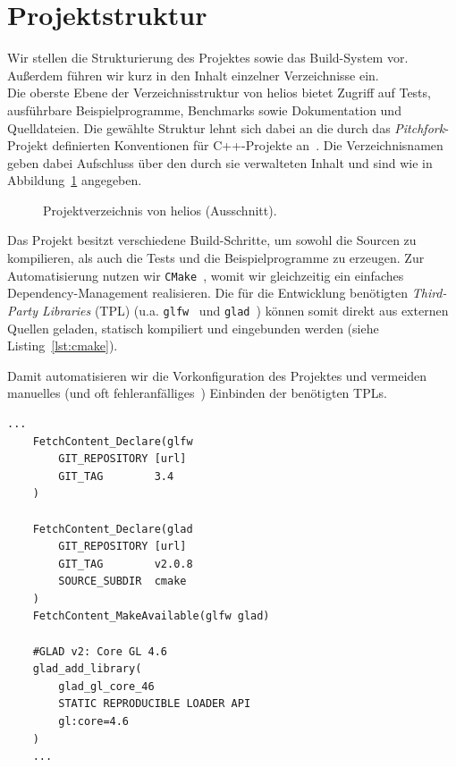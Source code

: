 \section{Projektstruktur}
Wir stellen die Strukturierung des Projektes sowie das Build-System vor.
Außerdem führen wir kurz in den Inhalt einzelner Verzeichnisse ein.\\

Die oberste Ebene der Verzeichnisstruktur von helios bietet Zugriff auf Tests, ausführbare Beispielprogramme, Benchmarks sowie Dokumentation und Quelldateien.
Die gewählte Struktur lehnt sich dabei an die durch das \textit{Pitchfork}-Projekt definierten Konventionen für C++-Projekte an~\cite[]{Pitchfork}.
Die Verzeichnisnamen geben dabei Aufschluss über den durch sie verwalteten Inhalt und sind wie in Abbildung~\ref{fig:verzeichnisstruktur} angegeben.\par

\begin{figure}[htbp]
    \setlength{\DTbaselineskip}{18pt}
    \caption{Projektverzeichnis von helios (Ausschnitt).}
    \label{fig:verzeichnisstruktur}
\end{figure}

Das Projekt besitzt verschiedene Build-Schritte, um sowohl die Sourcen zu kompilieren, als auch die Tests und die Beispielprogramme zu erzeugen.
Zur Automatisierung nutzen wir \texttt{CMake}~\cite[]{CMake}, womit wir gleichzeitig ein einfaches Dependency-Management realisieren.
Die für die Entwicklung benötigten \textit{Third-Party Libraries} (TPL) (u.a. \texttt{glfw}~\cite[]{glfwHomepage} und \texttt{glad}~\cite[]{gladgithub}) können somit direkt aus externen Quellen geladen, statisch kompiliert und eingebunden werden (siehe Listing~\ref{lst:cmake}).\par

Damit automatisieren wir die Vorkonfiguration des Projektes und vermeiden manuelles (und oft fehleranfälliges~\cite[]{FG22}) Einbinden der benötigten TPLs.

\vspace{4mm}
\begin{lstlisting}[style=c++style, caption={Ausschnitt aus der CMakeLists.txt von helios: Dieser Abschnitt deklariert und bezieht GLFW v3.4 und GLAD v2.0.8 per FetchContent von den jeweiligen Github-Repositories (URLs der Übersicht halber ausgelassen). Im Anschluss wird ein GLAD-Loader für OpenGL 4.6 als statische Bibliothek erzeugt.}, label=lst:cmake]
    ...
    FetchContent_Declare(glfw
        GIT_REPOSITORY [url]
        GIT_TAG        3.4
    )

    FetchContent_Declare(glad
        GIT_REPOSITORY [url]
        GIT_TAG        v2.0.8
        SOURCE_SUBDIR  cmake
    )
    FetchContent_MakeAvailable(glfw glad)

    #GLAD v2: Core GL 4.6
    glad_add_library(
        glad_gl_core_46
        STATIC REPRODUCIBLE LOADER API
        gl:core=4.6
    )
    ...
\end{lstlisting}
\vspace{4mm}

